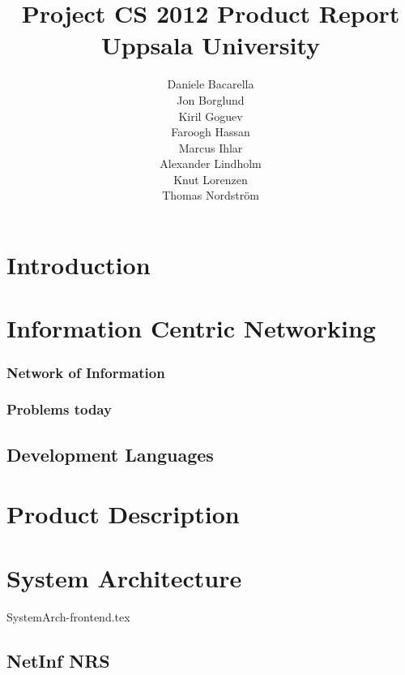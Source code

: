 \documentclass[11pt]{report}
\title{Project CS 2012 Product Report\\Uppsala University\\}
\author{Daniele Bacarella\\
		Jon Borglund\\
		Kiril Goguev\\
		Faroogh Hassan\\
		Marcus Ihlar\\
		Alexander Lindholm\\
		Knut Lorenzen\\
		Thomas Nordstr\"om\\
}
\date{}
\begin{document}
\maketitle

\tableofcontents

\chapter{Introduction}
\chapter{Information Centric Networking}

\subsection{Network of Information}
\subsection{Problems  today}
\section{Development Languages}



\chapter{Product Description}







\chapter{System Architecture}

 {SystemArch-frontend.tex}

\section {NetInf NRS}








\end{document}
